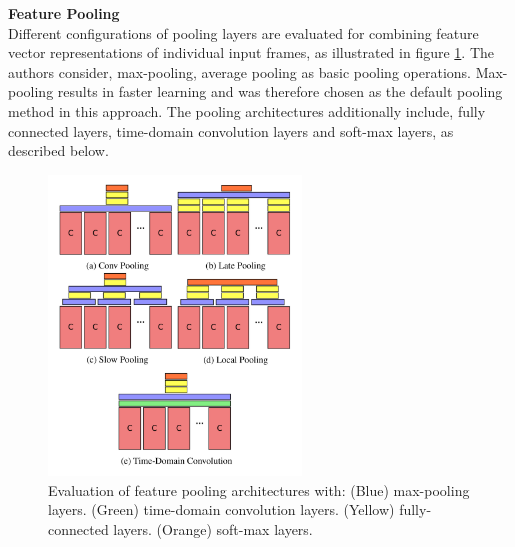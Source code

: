 \textbf{Feature Pooling}\\
Different configurations of pooling layers are evaluated for combining feature vector representations of individual input frames, as illustrated in figure \ref{fig:beyondshort_poolingarchitectures}.
The authors consider, max-pooling, average pooling as basic pooling operations.
Max-pooling results in faster learning and was therefore chosen as the default pooling method in this approach. 
The pooling architectures additionally include, fully connected layers, time-domain convolution layers and soft-max layers, as described below.

\begin{figure}[H]
    \centering
    \includegraphics[width=0.6\textwidth]{img_deep/beyondshort_poolingarchitectures}
    \caption{Evaluation of feature pooling architectures with: (Blue) max-pooling layers. (Green) time-domain convolution layers. (Yellow) fully-connected layers. (Orange) soft-max layers. \cite{ng_beyond_2015}}
    \label{fig:beyondshort_poolingarchitectures}
\end{figure}

